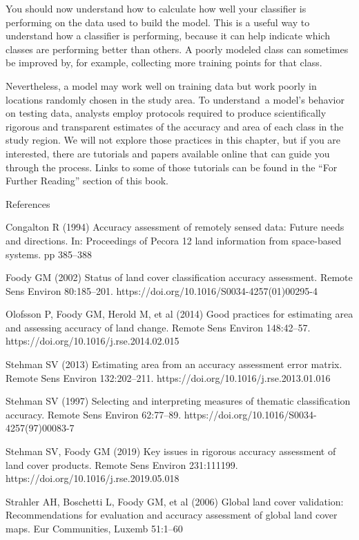 \documentclass[
  letterpaper,
  DIV=11,
  numbers=noendperiod]{scrreprt}
\begin{document}

You should now understand how to calculate how well your classifier is
performing on the data used to build the model. This is a useful way to
understand how a classifier is performing, because it can help indicate
which classes are performing better than others. A poorly modeled class
can sometimes be improved by, for example, collecting more training
points for that class.

Nevertheless, a model may work well on training data but work poorly in
locations randomly chosen in the study area. To understand~a model's
behavior on testing data, analysts employ protocols required to produce
scientifically rigorous and transparent estimates of the accuracy and
area of each class in the study region. We will not explore those
practices in this chapter, but if you are interested, there are
tutorials and papers available online that can guide you through the
process. Links to some of those tutorials can be found in the ``For
Further Reading'' section of this book.

References

Congalton R (1994) Accuracy assessment of remotely sensed data: Future
needs and directions. In: Proceedings of Pecora 12 land information from
space-based systems. pp 385--388

Foody GM (2002) Status of land cover classification accuracy assessment.
Remote Sens Environ 80:185--201.
https://doi.org/10.1016/S0034-4257(01)00295-4

Olofsson P, Foody GM, Herold M, et al (2014) Good practices for
estimating area and assessing accuracy of land change. Remote Sens
Environ 148:42--57. https://doi.org/10.1016/j.rse.2014.02.015

Stehman SV (2013) Estimating area from an accuracy assessment error
matrix. Remote Sens Environ 132:202--211.
https://doi.org/10.1016/j.rse.2013.01.016

Stehman SV (1997) Selecting and interpreting measures of thematic
classification accuracy. Remote Sens Environ 62:77--89.
https://doi.org/10.1016/S0034-4257(97)00083-7

Stehman SV, Foody GM (2019) Key issues in rigorous accuracy assessment
of land cover products. Remote Sens Environ 231:111199.
https://doi.org/10.1016/j.rse.2019.05.018

Strahler AH, Boschetti L, Foody GM, et al (2006) Global land cover
validation: Recommendations for evaluation and accuracy assessment of
global land cover maps. Eur Communities, Luxemb 51:1--60
\end{document}
